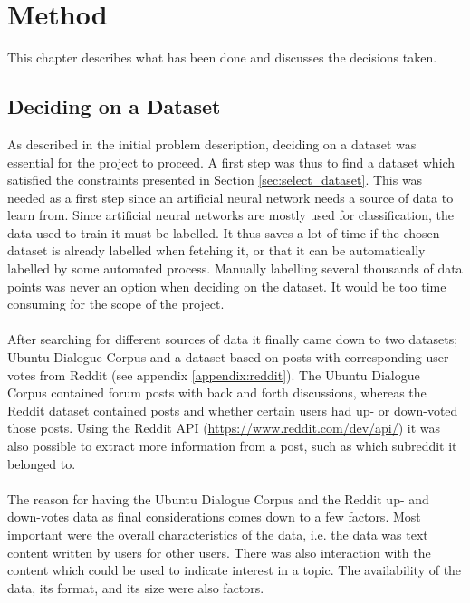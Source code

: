 \chapter{Method}\label{chap:method}
This chapter describes what has been done and discusses the decisions taken.

\section{Deciding on a Dataset}\label{sec:deciding_dataset}
As described in the initial problem description, deciding on a dataset was essential for the project to proceed. A first step was thus to find a dataset which satisfied the constraints presented in Section \ref{sec:select_dataset}. This was needed as a first step since an artificial neural network needs a source of data to learn from. Since artificial neural networks are mostly used for classification, the data used to train it must be labelled. It thus saves a lot of time if the chosen dataset is already labelled when fetching it, or that it can be automatically labelled by some automated process. Manually labelling several thousands of data points was never an option when deciding on the dataset. It would be too time consuming for the scope of the project.
\\\\
After searching for different sources of data it finally came down to two datasets; Ubuntu Dialogue Corpus \parencite{lowe2015ubuntu} and a dataset based on posts with corresponding user votes from Reddit (see appendix \ref{appendix:reddit}). The Ubuntu Dialogue Corpus contained forum posts with back and forth discussions, whereas the Reddit dataset contained posts and whether certain users had up- or down-voted those posts. Using the Reddit API (\url{https://www.reddit.com/dev/api/}) it was also possible to extract more information from a post, such as which subreddit it belonged to.
\\\\
The reason for having the Ubuntu Dialogue Corpus and the Reddit up- and down-votes data as final considerations comes down to a few factors. Most important were the overall characteristics of the data, i.e. the data was text content written by users for other users. There was also interaction with the content which could be used to indicate interest in a topic. The availability of the data, its format, and its size were also factors.
\\\\
